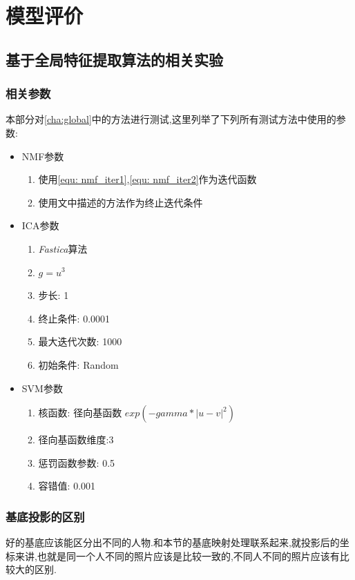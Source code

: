 \chapter{模型评价}

\section{基于全局特征提取算法的相关实验}
\label{sec:comp_global}
\subsection{相关参数}
本部分对\ref{cha:global}中的方法进行测试,这里列举了下列所有测试方法中使用的参数:
\begin{itemize}
	\item NMF参数
		\begin{enumerate}
		\item 使用\ref{equ: nmf_iter1},\ref{equ: nmf_iter2}作为迭代函数
		\item 使用文中描述的方法作为终止迭代条件			
		\end{enumerate}
	\item ICA参数 \begin{enumerate}
		\item \textit{Fastica}算法
		\item $g = u^3$
		\item 步长: 1
		\item 终止条件: 0.0001
		\item 最大迭代次数: 1000
		\item 初始条件: Random	\end{enumerate}
	\item SVM参数 \begin{enumerate}
		\item 核函数: 径向基函数 $exp(-gamma*|u-v|^2)$
		\item 径向基函数维度:3
		\item 惩罚函数参数: 0.5
		\item 容错值: 0.001	\end{enumerate}
\end{itemize}
		
\subsection{基底投影的区别}
\label{sec:pnibase}
好的基底应该能区分出不同的人物.和本节的基底映射处理联系起来,就投影后的坐标来讲,也就是同一个人不同的照片应该是比较一致的,不同人不同的照片应该有比较大的区别.\newline

